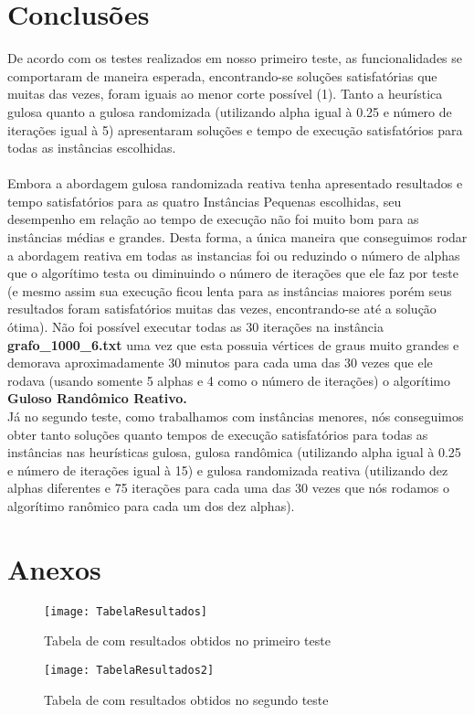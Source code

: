\documentclass[a4paper, 12pt]{article}
\begin{document}
\section{Conclusões}
De acordo com os testes realizados em nosso primeiro teste, as funcionalidades se comportaram de maneira esperada, encontrando-se soluções satisfatórias que muitas das vezes, foram iguais ao menor corte possível (1). Tanto a heurística gulosa quanto a gulosa randomizada (utilizando alpha igual à 0.25 e número de iterações igual à 5) apresentaram soluções e tempo de execução satisfatórios para todas as instâncias escolhidas.
\\ 
\\
\ident Embora a abordagem gulosa randomizada reativa tenha apresentado resultados e tempo satisfatórios para as 
quatro Instâncias Pequenas escolhidas, seu desempenho em relação ao tempo de execução não foi muito bom para as instâncias médias e grandes. Desta forma, a única maneira que conseguimos rodar a abordagem reativa em todas as instancias foi ou reduzindo o número de alphas que o algorítimo testa ou diminuindo o número de iterações que ele faz por teste (e mesmo assim sua execução ficou lenta para as instâncias maiores porém seus resultados foram satisfatórios muitas das vezes, encontrando-se até a solução ótima). Não foi possível executar todas as 30 iterações na instância \textbf{grafo\_1000\_6.txt} uma vez que esta possuia vértices de graus muito grandes e demorava aproximadamente 30 minutos para cada uma das 30 vezes que ele rodava (usando somente 5 alphas e 4 como o número de iterações) o algorítimo \textbf{Guloso Randômico Reativo.} \\

\ident Já no segundo teste, como trabalhamos com instâncias menores, nós conseguimos obter tanto soluções quanto tempos de execução satisfatórios para todas as instâncias nas heurísticas gulosa, gulosa randômica (utilizando alpha igual à 0.25 e número de iterações igual à 15) e gulosa randomizada reativa (utilizando dez alphas diferentes e 75 iterações para cada uma das 30 vezes que nós rodamos o algorítimo ranômico para cada um dos dez alphas).

\section{Anexos}

  \begin{figure}[h]
    \centering
    \texttt{[image: TabelaResultados]}
    \caption{Tabela de com resultados obtidos no primeiro teste }
  \end{figure}

  \begin{figure}[h]
    \centering
    \texttt{[image: TabelaResultados2]}
    \caption{Tabela de com resultados obtidos no segundo teste }
  \end{figure}
\end{document}
